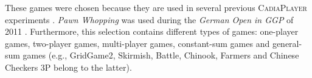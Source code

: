 \documentclass[journal]{IEEEtran}
\begin{document}
These games were chosen because they are used in several previous \textsc{CadiaPlayer} experiments \cite{finnssonthesis,FinnssonB08a,FinnssonB09a,BjornssonF09,FinnssonB10a,FinnssonB11a,finnsonphdthesis}. \textit{Pawn Whopping} was used during the \textit{German Open in GGP} of 2011 \cite{germanopen}. Furthermore, this selection contains different types of games: one-player games, two-player games, multi-player games, constant-sum games and general-sum games (e.g., GridGame2, Skirmish, Battle, Chinook, Farmers and Chinese Checkers 3P belong to the latter).




%



\ifCLASSOPTIONcaptionsoff
  \newpage
\fi





%
%
%

\end{document}
